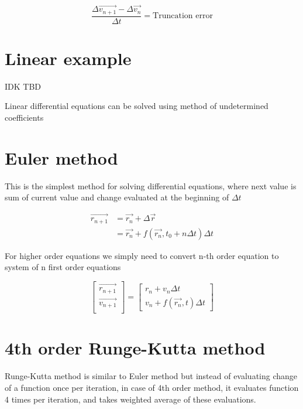 \documentclass[english,12pt,a4paper]{report}
\begin{document}
	\begin{equation}
		\frac{\Delta \vec{v_{n+1}} - \Delta \vec{v_n}}{\Delta t} = \text{Truncation error}
	\end{equation}
	
	\section{Linear example}
	\alert{IDK TBD}
	
	Linear differential equations can be solved using method of undetermined coefficients
	
	\section{Euler method}
	This is the simplest method for solving differential equations, where next value is sum of current value and change evaluated at the beginning of $\Delta t$ 
		
	\begin{equation}
		\begin{split}
			\vec{r_{n+1}} &= \vec{r_{n}} + \Delta \vec{r} \\
			&= \vec{r_{n}} + f(\vec{r_n}, t_0 + n \Delta t) \Delta t
		\end{split}
	\end{equation}
	
	For higher order equations we simply need to convert n-th order equation to system of n first order equations
	
	\begin{equation}
		\begin{bmatrix}
			\vec{r_{n+1}}\\
			\vec{v_{n+1}}\\
		\end{bmatrix}
		=
		\begin{bmatrix}
			r_n + v_n \Delta t\\
			v_n + f(\vec{r_n}, t) \Delta t
		\end{bmatrix}
	\end{equation}
	
	\section{4th order Runge-Kutta method}
	
	Runge-Kutta method is similar to Euler method but instead of evaluating change of a function once per iteration, in case of 4th order method, it evaluates function 4 times per iteration, and takes weighted average of these evaluations.
	
\end{document}
